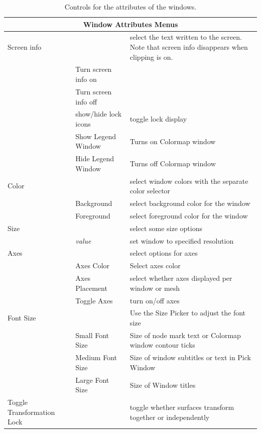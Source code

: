 \begin{table}[ht]
  \caption{Controls for the attributes of the \map{} windows.}
  \begin{center}
    \begin{tabular}{|l|l|p{3 in}|} \hline
      \multicolumn{3}{|c|}{\textbf{Window Attributes Menus}} \\ \hline
    Screen info & & select the text written to the screen.  
    Note that screen info 
       disappears when clipping is on.\\
      & Turn screen info on & \\
      & Turn screen info off & \\ 
      & show/hide lock icons & toggle lock display \\ \hline
      & Show Legend Window & Turns on Colormap window \\ 
      & Hide Legend Window & Turns off Colormap window \\ 
    Color & & select window colors with the separate color selector \\
      & Background & select background color for the window \\
      & Foreground & select foreground color for the window \\ \hline
    Size & & select some size options \\
      & \emph{value} & set window to specified resolution \\
    Axes & & select options for axes \\
      & Axes Color & Select axes color \\
      & Axes Placement & select whether axes displayed per window or mesh \\
      & Toggle Axes & turn on/off axes \\ \hline
    Font Size & & Use the Size Picker to adjust the font size \\
      & Small Font Size & Size of node mark text or Colormap window contour 
        ticks \\
      & Medium Font Size & Size of window subtitles or text in Pick Window \\
      & Large Font Size & Size of Window titles \\
    Toggle Transformation Lock & & toggle whether surfaces transform 
        together or independently \\ \hline
    \end{tabular}
  \end{center}
\end{table}


